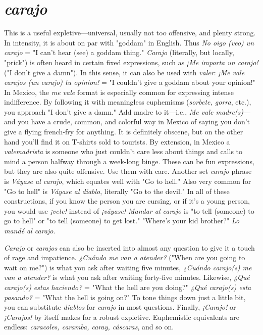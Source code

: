 \section{\emph{carajo}}

This is a useful expletive---universal, usually not too offensive, and plenty strong. In intensity, it is about on par with "goddam"
in English. Thus \emph{No oigo (veo) un carajo} = "I can't hear (see) a goddam thing." \emph{Carajo} (literally, but locally, "prick") is often heard in certain fixed expressions, such as \emph{¡Me importa un carajo!} ("I don't give a
damn"). In this sense, it can also be used with \emph{valer}: \emph{¡Me vale carajos
(un carajo) tu opinion!} = "I couldn't give a goddam about your
opinion!"
In Mexico, the \emph{me vale} format is especially common for expressing intense indifference. By following it with meaningless euphemisms (\emph{sorbete, gorra}, etc.), you approach "I don't give a damn." Add
madre to it---i.e., \emph{Me vale madre(s)}---and you have a crude, common,
and colorful way in Mexico of saying you don't give a flying french-fry
for anything. It is definitely obscene, but on the other hand you'll find
it on T-shirts sold to tourists. By extension, in Mexico a \emph{valemadrista}
is someone who just couldn't care less about things and calls to mind
a person halfway through a week-long binge. These can be fun expressions, but they are also quite offensive. Use them with care.
Another set \emph{carajo} phrase is \emph{Váyase al carajo}, which equates
well with "Go to hell." Also very common for "Go to hell" is \emph{Váyase
al diablo}, literally "Go to the devil." In all of these constructions, if
you know the person you are cursing, or if it's a young person, you
would use \emph{¡vete!} instead of \emph{¡váyase!} \emph{Mandar al carajo} is "to tell (someone) to go to hell" or "to tell (someone) to get lost." "Where's your kid
brother?" \emph{Lo mandé al carajo}.

\emph{Carajo} or \emph{carajos} can also be inserted into almost any
question to give it a touch of rage and impatience. \emph{¿Cuándo me van a atender?} ("When are you going to wait on me?") is what you ask after waiting five minutes, \emph{¿Cuándo carajo(s) me van a atender?} is what you ask
after waiting forty-five minutes. Likewise, \emph{¿Qué carajo(s) estas haciendo?} = "What the hell are you doing?" \emph{¿Qué carajo(s) esta pasando?}
= "What the hell is going on?" To tone things down just a little bit,
you can substitute \emph{diablos} for \emph{carajo} in most questions.
Finally, \emph{¡Carajo!} or \emph{¡Carajos!} by itself makes for a robust expletive. Euphemistic equivalents are endless: \emph{caracoles, caramba,
caray, cáscaras}, and so on.

